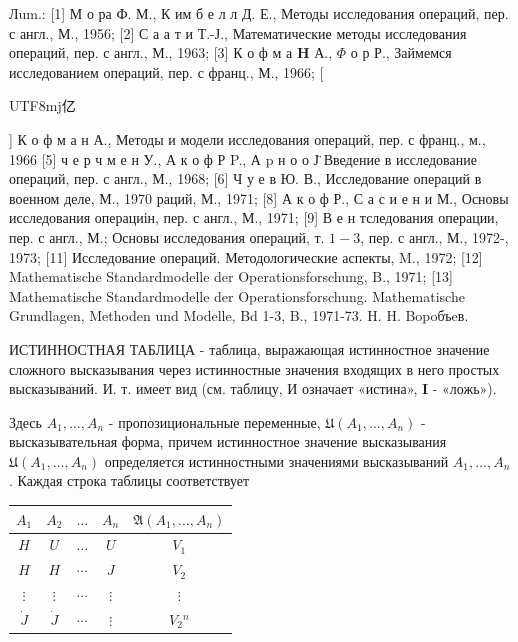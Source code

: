 \documentclass[10pt]{article}
\begin{document}
Лum.: [1] М о ра Ф. М., К им б е л л Д. Е., Методы исследования операций, пер. с англ., М., 1956; [2] С а а т и Т.-Ј., Математические методы исследования операций, пер. с англ., М., 1963; [3] К о ф м а $\mathbf{H}$ А., $\Phi$ о р Р., Займемся исследованием операций, пер. с франц., М., 1966; [\begin{CJK}{UTF8}{mj}亿\end{CJK}] К о ф м а н А., Методы и модели исследования операций, пер. с франц., м., 1966 [5] ч е р ч м е н У., А к о ф Р P., А p н о о Ј̈ Введение в исследование операций, пер. с англ., М., 1968; [6] Ч у е в Ю. В., Исследование операций в военном деле, М., 1970 раций, М., 1971; [8] А к о ф Р., С а с и е н и М., Основы исследования операциін, пер. с англ., М., 1971; [9] В е н тследования операции, пер. с англ., М.; Основы исследования операций, т. $1-3$, пер. с англ., М., 1972-, 1973; [11] Исследование операций. Методологические аспекты, M., 1972; [12] Mathematische Standardmodelle der Operationsforschung, B., 1971; [13] Mathematische Standardmodelle der Operationsforschung. Mathematische Grundlagen, Methoden und Modelle, Bd 1-3, B., 1971-73. H. H. Bopoбъeв.



ИСТИННОСТНАЯ ТАБЛИЦА - таблица, выражающая истинностное значение сложного высказывания через истинностные значения входящих в него простых высказываний. И. т. имеет вид (см. таблицу, И означает «истина», $\boldsymbol{I}$ - «ложь»).



Здесь $A_{1}, \ldots, A_{n}$ - пропозициональные переменные, $\mathfrak{U}\left(A_{1}, \ldots, A_{n}\right)$ - высказывательная форма, причем истинностное значение высказывания $\mathfrak{U}\left(A_{1}, \ldots, A_{n}\right)$ определяется истинностными значениями высказываний $A_{1}, \ldots, A_{n}$. Каждая строка таблицы соответствует



\begin{center}

\begin{tabular}{c|c|c|c|c}

\hline

$A_{1}$ & $A_{2}$ & $\ldots$ & $A_{n}$ & $\mathfrak{A}\left(A_{1}, \ldots, A_{n}\right)$ \\

\hline

$H$ & $U$ & $\ldots$ & $U$ & $V_{1}$ \\

$H$ & $H$ & $\cdots$ & $J$ & $V_{2}$ \\

$\vdots$ & $\vdots$ & $\cdots$ & $\vdots$ & $\vdots$ \\

$\dot{J}$ & $\dot{J}$ & $\cdots$ & $\vdots$ & $V_{2}{ }^{n}$ \\

\hline

\end{tabular}

\end{center}
\end{document}
